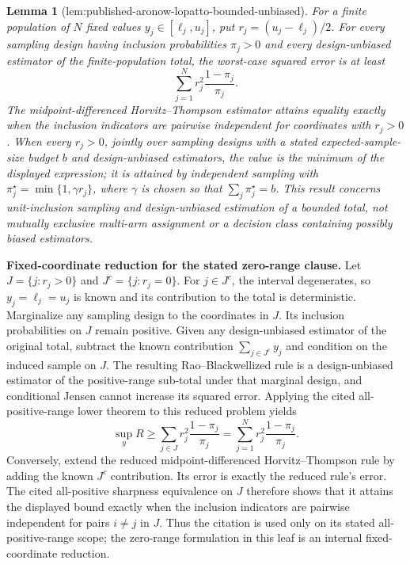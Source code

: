 \documentclass{article}
\newtheorem{lemma}{Lemma}
\begin{document}
\begin{lemma}[lem:published-aronow-lopatto-bounded-unbiased]\label{lem:published-aronow-lopatto-bounded-unbiased}
For a finite population of \(N\) fixed values \(y_j\in[\ell_j,u_j]\), put \(r_j=(u_j-\ell_j)/2\). For every sampling design having inclusion probabilities \(\pi_j>0\) and every design-unbiased estimator of the finite-population total, the worst-case squared error is at least
\[
 \sum_{j=1}^N r_j^2\frac{1-\pi_j}{\pi_j}.
\]
The midpoint-differenced Horvitz--Thompson estimator attains equality exactly when the inclusion indicators are pairwise independent for coordinates with \(r_j>0\). When every \(r_j>0\), jointly over sampling designs with a stated expected-sample-size budget \(b\) and design-unbiased estimators, the value is the minimum of the displayed expression; it is attained by independent sampling with \(\pi_j^\star=\min\{1,\gamma r_j\}\), where \(\gamma\) is chosen so that \(\sum_j\pi_j^\star=b\). This result concerns unit-inclusion sampling and design-unbiased estimation of a bounded total, not mutually exclusive multi-arm assignment or a decision class containing possibly biased estimators.
\end{lemma}
\textbf{Fixed-coordinate reduction for the stated zero-range clause.}  Let \(J=\{j:r_j>0\}\) and \(J^c=\{j:r_j=0\}\).  For \(j\in J^c\), the interval degenerates, so \(y_j=\ell_j=u_j\) is known and its contribution to the total is deterministic.  Marginalize any sampling design to the coordinates in \(J\).  Its inclusion probabilities on \(J\) remain positive.  Given any design-unbiased estimator of the original total, subtract the known contribution \(\sum_{j\in J^c}y_j\) and condition on the induced sample on \(J\).  The resulting Rao--Blackwellized rule is a design-unbiased estimator of the positive-range sub-total under that marginal design, and conditional Jensen cannot increase its squared error.  Applying the cited all-positive-range lower theorem to this reduced problem yields
\[
 \sup_y R\geq\sum_{j\in J}r_j^2\frac{1-\pi_j}{\pi_j}
 =\sum_{j=1}^Nr_j^2\frac{1-\pi_j}{\pi_j}.
\]
Conversely, extend the reduced midpoint-differenced Horvitz--Thompson rule by adding the known \(J^c\) contribution.  Its error is exactly the reduced rule's error.  The cited all-positive sharpness equivalence on \(J\) therefore shows that it attains the displayed bound exactly when the inclusion indicators are pairwise independent for pairs \(i\ne j\) in \(J\).  Thus the citation is used only on its stated all-positive-range scope; the zero-range formulation in this leaf is an internal fixed-coordinate reduction.
\end{document}

